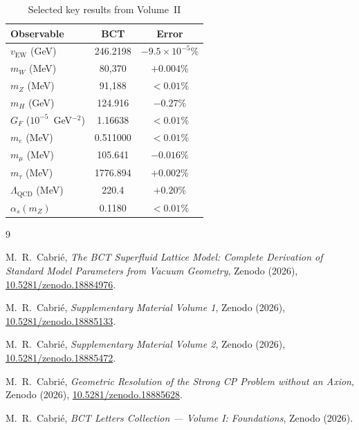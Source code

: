 \documentclass[aps,prl,twocolumn,showpacs,preprintnumbers]{revtex4-2}
\newcommand{\LQCD}{\Lambda_{\mathrm{QCD}}}
\begin{document}
\begin{table}[h]
\centering
\caption{Selected key results from Volume~II}
\begin{tabular}{lcc}
\toprule
Observable & BCT & Error \\
\midrule
$v_{\mathrm{EW}}$ (GeV) & 246.2198 & $-9.5\times10^{-5}\%$ \\
$m_W$ (MeV) & 80{,}370 & $+0.004\%$ \\
$m_Z$ (MeV) & 91{,}188 & $<0.01\%$ \\
$m_H$ (GeV) & 124.916 & $-0.27\%$ \\
$G_F$ ($10^{-5}$~GeV$^{-2}$) & 1.16638 & $<0.01\%$ \\
$m_e$ (MeV) & 0.511000 & $<0.01\%$ \\
$m_\mu$ (MeV) & 105.641 & $-0.016\%$ \\
$m_\tau$ (MeV) & 1776.894 & $+0.002\%$ \\
$\LQCD$ (MeV) & 220.4 & $+0.20\%$ \\
$\alpha_s(m_Z)$ & 0.1180 & $<0.01\%$ \\
\bottomrule
\end{tabular}
\end{table}

\begin{thebibliography}{9}

M.~R.\ Cabri\'e,
\textit{The BCT Superfluid Lattice Model: Complete Derivation of
Standard Model Parameters from Vacuum Geometry},
Zenodo (2026),
\href{https://doi.org/10.5281/zenodo.18884976}{10.5281/zenodo.18884976}.

M.~R.\ Cabri\'e,
\textit{Supplementary Material Volume 1},
Zenodo (2026),
\href{https://doi.org/10.5281/zenodo.18885133}{10.5281/zenodo.18885133}.

M.~R.\ Cabri\'e,
\textit{Supplementary Material Volume 2},
Zenodo (2026),
\href{https://doi.org/10.5281/zenodo.18885472}{10.5281/zenodo.18885472}.

M.~R.\ Cabri\'e,
\textit{Geometric Resolution of the Strong CP Problem without an Axion},
Zenodo (2026),
\href{https://doi.org/10.5281/zenodo.18885628}{10.5281/zenodo.18885628}.

M.~R.\ Cabri\'e,
\textit{BCT Letters Collection --- Volume I: Foundations},
Zenodo (2026).

\end{thebibliography}
\end{document}
